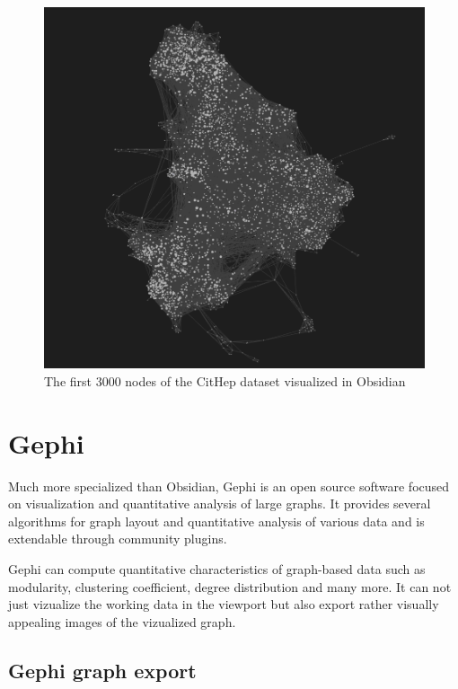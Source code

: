 \begin{figure}[p]\centering
  \includegraphics[width=140mm, keepaspectratio]{img/Obsidian_3000}
  \caption{The first 3000 nodes of the CitHep dataset visualized in Obsidian}
  \label{obr:obsidian_3000}
\end{figure}

\section{Gephi}

Much more specialized than Obsidian, Gephi \cite{gephi_homepage} is an open source software focused on visualization and quantitative analysis of large graphs.
It provides several algorithms for graph layout and quantitative analysis of various data and is extendable through community plugins.

Gephi can compute quantitative characteristics of graph-based data such as modularity, clustering coefficient, degree distribution and many more.
It can not just vizualize the working data in the viewport but also export rather visually appealing images of the vizualized graph.

\subsection*{Gephi graph export}

